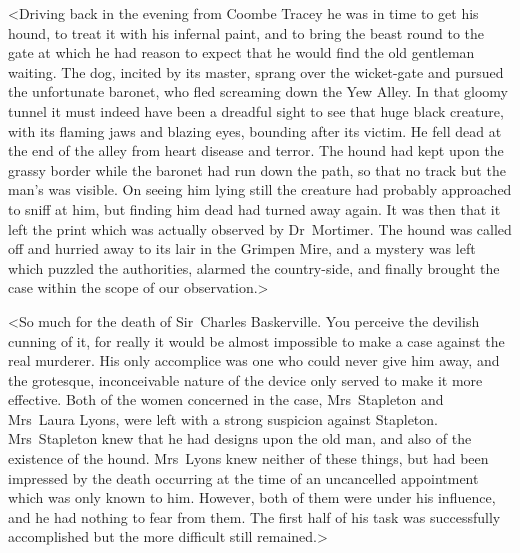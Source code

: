 <Driving back in the evening from Coombe Tracey he was in time to get his hound, to treat it with his infernal paint, and to bring the beast round to the gate at which he had reason to expect that he would find the old gentleman waiting. The dog, incited by its master, sprang over the wicket-gate and pursued the unfortunate baronet, who fled screaming down the Yew Alley. In that gloomy tunnel it must indeed have been a dreadful sight to see that huge black creature, with its flaming jaws and blazing eyes, bounding after its victim. He fell dead at the end of the alley from heart disease and terror. The hound had kept upon the grassy border while the baronet had run down the path, so that no track but the man's was visible. On seeing him lying still the creature had probably approached to sniff at him, but finding him dead had turned away again. It was then that it left the print which was actually observed by Dr~Mortimer. The hound was called off and hurried away to its lair in the Grimpen Mire, and a mystery was left which puzzled the authorities, alarmed the country-side, and finally brought the case within the scope of our observation.>

<So much for the death of Sir~Charles Baskerville. You perceive the devilish cunning of it, for really it would be almost impossible to make a case against the real murderer. His only accomplice was one who could never give him away, and the grotesque, inconceivable nature of the device only served to make it more effective. Both of the women concerned in the case, Mrs~Stapleton and Mrs~Laura Lyons, were left with a strong suspicion against Stapleton. Mrs~Stapleton knew that he had designs upon the old man, and also of the existence of the hound. Mrs~Lyons knew neither of these things, but had been impressed by the death occurring at the time of an uncancelled appointment which was only known to him. However, both of them were under his influence, and he had nothing to fear from them. The first half of his task was successfully accomplished but the more difficult still remained.>

